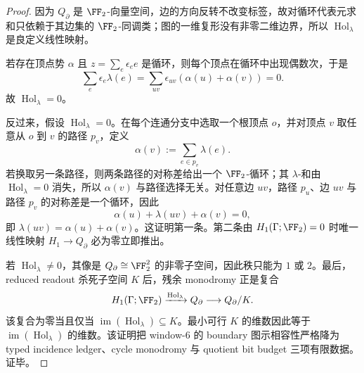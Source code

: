 \begin{proof}
因为 \(Q_{\partial}\) 是 \(\FF_2\)-向量空间，边的方向反转不改变标签，故对循环代表元求和只依赖于其边集的 \(\FF_2\)-同调类；图的一维复形没有非零二维边界，所以 \(\operatorname{Hol}_{\lambda}\) 是良定义线性映射。

若存在顶点势 \(\alpha\) 且 \(z=\sum_e\epsilon_e e\) 是循环，则每个顶点在循环中出现偶数次，于是
\[
\sum_e\epsilon_e\lambda(e)
=\sum_{uv}\epsilon_{uv}(\alpha(u)+\alpha(v))=0.
\]
故 \(\operatorname{Hol}_{\lambda}=0\)。

反过来，假设 \(\operatorname{Hol}_{\lambda}=0\)。在每个连通分支中选取一个根顶点 \(o\)，并对顶点 \(v\) 取任意从 \(o\) 到 \(v\) 的路径 \(p_v\)，定义
\[
\alpha(v):=\sum_{e\in p_v}\lambda(e).
\]
若换取另一条路径，则两条路径的对称差给出一个 \(\FF_2\)-循环；其 \(\lambda\)-和由 \(\operatorname{Hol}_{\lambda}=0\) 消失，所以 \(\alpha(v)\) 与路径选择无关。对任意边 \(uv\)，路径 \(p_u\)、边 \(uv\) 与路径 \(p_v\) 的对称差是一个循环，因此
\[
\alpha(u)+\lambda(uv)+\alpha(v)=0,
\]
即 \(\lambda(uv)=\alpha(u)+\alpha(v)\)。这证明第一条。第二条由 \(H_1(\Gamma;\FF_2)=0\) 时唯一线性映射 \(H_1\to Q_{\partial}\) 必为零立即推出。

若 \(\operatorname{Hol}_{\lambda}\ne0\)，其像是 \(Q_{\partial}\cong\FF_2^2\) 的非零子空间，因此秩只能为 \(1\) 或 \(2\)。最后，reduced readout 杀死子空间 \(K\) 后，残余 monodromy 正是复合
\[
H_1(\Gamma;\FF_2)\xrightarrow{\operatorname{Hol}_{\lambda}}Q_{\partial}\longrightarrow Q_{\partial}/K.
\]
该复合为零当且仅当 \(\operatorname{im}(\operatorname{Hol}_{\lambda})\subseteq K\)。最小可行 \(K\) 的维数因此等于 \(\operatorname{im}(\operatorname{Hol}_{\lambda})\) 的维数。该证明把 window-\(6\) 的 boundary 图示相容性严格降为 typed incidence ledger、cycle monodromy 与 quotient bit budget 三项有限数据。证毕。
\end{proof}

